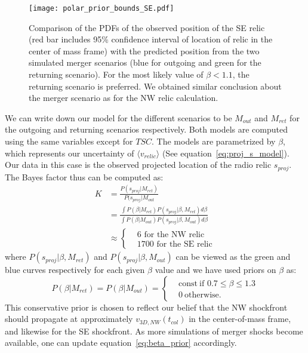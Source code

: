 \begin{figure}
	\texttt{[image: polar\_prior\_bounds\_SE.pdf]}
	\caption{Comparison of the PDFs of the observed position of the SE relic (red bar
		includes 95\% confidence interval of location of relic in the center of
		mass frame) with the	predicted position from the two simulated merger scenarios (blue for
	outgoing and green for the returning scenario). 
	For the most likely value of $\beta < 1.1$, the returning scenario is preferred. 
	We obtained similar conclusion about the merger scenario as for the NW
	relic calculation.
	\label{fig:positionprior_SE}}
\end{figure}
We can write down our model for the different scenarios to be $M_{out}$ and
$M_{ret}$ for the outgoing and returning scenarios respectively. Both
models are computed using the same variables except for $TSC$. The models
are parametrized by $\beta$, which represents our uncertainty of $\langle v_{relic} \rangle$
(See equation~\ref{eq:proj_s_model}). Our data in this
case is the observed projected location of the radio relic $s_{proj}$. 
The Bayes factor thus can be computed as: 
\begin{align}
	K &= \frac{P(s_{proj} | M_{ret})}{P(s_{proj}| M_{out}}\\
	 &= \frac
	 {\int P(\beta | M_{ret}) P(s_{proj} | \beta, M_{ret}) d\beta}
	 {\int P(\beta | M_{out}) P(s_{proj} | \beta, M_{out})
 d\beta}\\
 &\approx 
 \begin{cases}
 & 6 \text{ for the NW relic}\\
 & 1700 \text{ for the SE relic}
 \end{cases}
\end{align}
where $P(s_{proj} | \beta, M_{ret})$ and $P(s_{proj} | \beta, M_{out})$ can be
viewed as the green and blue curves respectively for each given $\beta$ value and we
have used priors on $\beta$ as: 
\begin{equation}
	\label{eq:beta_prior}
	P(\beta | M_{ret}) = P(\beta | M_{out}) =  
	\begin{cases}
		& \text{const}~\text{if } 0.7 \leq \beta \leq 1.3 \\
		& 0~\text{otherwise}.
	\end{cases}
\end{equation}
This conservative prior is chosen to reflect our belief that the
NW shockfront should propagate at approximately $v_{3D, NW}(t_{col})$ in the
center-of-mass frame, and likewise for the SE shockfront.  
As more
simulations of merger shocks become available, one can update equation~\ref{eq:beta_prior} accordingly.


\bsp 
\label{lastpage} 

